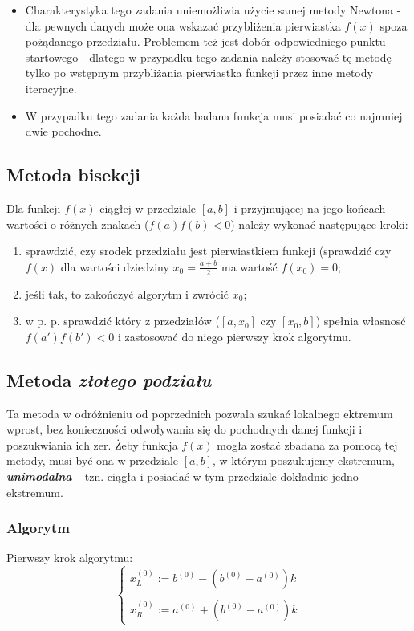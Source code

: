 \documentclass[a4paper,11pt]{article}
\begin{document}
  \begin{itemize}
    \item Charakterystyka tego zadania uniemożliwia użycie samej metody Newtona - dla pewnych danych może ona wskazać przybliżenia pierwiastka \( f(x) \) spoza pożądanego przedziału. Problemem też jest dobór odpowiedniego punktu startowego - dlatego w przypadku tego zadania należy stosować tę metodę tylko po wstępnym przybliżania pierwiastka funkcji przez inne metody iteracyjne.
    \item W przypadku tego zadania każda badana funkcja musi posiadać co najmniej dwie pochodne.
  \end{itemize}
  
  \subsection{Metoda bisekcji}
  Dla funkcji \( f(x) \) ciągłej w przedziale \( [a,b] \) i przyjmującej na jego końcach wartości o różnych znakach (\( f(a) f(b) < 0 \)) należy wykonać następujące kroki:
  \begin{enumerate}
    \item sprawdzić, czy srodek przedziału jest pierwiastkiem funkcji (sprawdzić czy \( f(x) \) dla wartości dziedziny \(x_0 = \frac {a + b} {2} \) ma wartość \(f(x_0) = 0 \);
    \item jeśli tak, to zakończyć algorytm i zwrócić \(x_0\);
    \item w p. p. sprawdzić który z przedziałów (\( [a, x_0] \) czy \( [x_0, b] \)) spełnia własnosć \( f(a')f(b') < 0 \) i zastosować do niego pierwszy krok algorytmu.
  \end{enumerate}
  
  \subsection{Metoda \emph{złotego podziału}}
    Ta metoda w odróżnieniu od poprzednich pozwala szukać lokalnego ektremum wprost, bez konieczności odwoływania się do pochodnych danej funkcji i poszukwiania ich zer. Żeby funkcja \( f(x) \) mogła zostać zbadana za pomocą tej metody, musi być ona w przedziale \( [a,b] \), w którym poszukujemy ekstremum, \textbf{\emph{unimodalna}} -- tzn. ciągła i posiadać w tym przedziale dokładnie jedno ekstremum.
    \subsubsection{Algorytm}
    Pierwszy krok algorytmu:
    $$ \left\{\begin{array}{l}
    x_L^{(0)} := b^{(0)} - (b^{(0)}-a^{(0)})k \\ \\
    x_R^{(0)} := a^{(0)} + (b^{(0)}-a^{(0)})k
    \end{array}\right. $$
    
\end{document}
